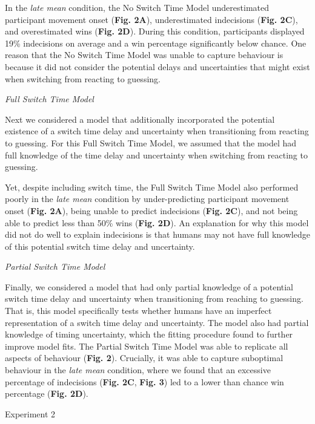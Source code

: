 \documentclass[12pt]{article}
\newcommand\boldblue[1]{\textcolor{mydarkblue}{\textbf{#1}}}
\newcommand{\SubSectionHeader}[1]{\noindent\Large{\textcolor{mydarkblue}{#1}}\normalsize }
\begin{document}
In the \emph{late mean} condition, the No Switch Time Model underestimated participant movement onset (\boldblue{Fig. 2A}), underestimated indecisions (\boldblue{Fig. 2C}), and overestimated wins (\boldblue{Fig. 2D}). During this condition, participants displayed 19\% indecisions on average and a win percentage significantly below chance. One reason that the No Switch Time Model was unable to capture behaviour is because it did not consider the potential delays and uncertainties that might exist when switching from reacting to guessing.

\vspace*{1mm}
\noindent\emph{{{Full Switch Time Model}}}

\noindent Next we considered a model that additionally incorporated the potential existence of a switch time delay and uncertainty when transitioning from reacting to guessing. For this Full Switch Time Model, we assumed that the model had full knowledge of the time delay and uncertainty when switching from reacting to guessing.

Yet, despite including switch time, the Full Switch Time Model also performed poorly in the \emph{late mean} condition by under-predicting participant movement onset (\boldblue{Fig. 2A}), being unable to predict indecisions (\boldblue{Fig. 2C}), and not being able to predict less than 50\% wins (\boldblue{Fig. 2D}). An explanation for why this model did not do well to explain indecisions is that humans may not have full knowledge of this potential switch time delay and uncertainty.

\vspace*{1mm}
\noindent\emph{{{Partial Switch Time Model}}}

\noindent Finally, we considered a model that had only partial knowledge of a potential switch time delay and uncertainty when transitioning from reaching to guessing. That is, this model specifically tests whether humans have an imperfect representation of a switch time delay and uncertainty. The model also had partial knowledge of timing uncertainty, which the fitting procedure found to further improve model fits. The Partial Switch Time Model was able to replicate all aspects of behaviour (\boldblue{Fig. 2}). Crucially, it was able to capture suboptimal behaviour in the \emph{late mean} condition, where we found that an excessive percentage of indecisions (\boldblue{Fig. 2C}, \boldblue{Fig. 3}) led to a lower than chance win percentage (\boldblue{Fig. 2D}).

\vspace{2mm}
\SubSectionHeader{Experiment 2}
\end{document}
